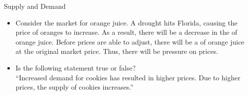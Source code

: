 \documentclass[pdf, handout]{beamer}
\begin{document}
\begin{frame}{Supply and Demand}
	
	\begin{itemize}
		\item Consider the market for orange juice. A drought hits Florida, causing the price of oranges to increase. As a result, there will be a decrease in the \underline{\hspace{2cm}} of orange juice. Before prices are able to adjust, there will be a \underline{\hspace{2cm}} of orange juice at the original market price. Thus, there will be \underline{\hspace{2cm}} pressure on prices.
		\pause
		\pause
		\item Is the following statement true or false?\\
		``Increased demand for cookies has resulted in higher prices. Due to higher prices, the supply of cookies increases.''
		
		\pause
		
	\end{itemize}
	
\end{frame}
\end{document}
